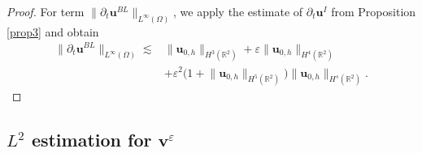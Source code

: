\documentclass[pdflatex,sn-mathphys-num]{sn-jnl}%
\theoremstyle{thmstyleone}%
\theoremstyle{thmstyletwo}%
\theoremstyle{thmstylethree}%
\theoremstyle{thmstyletwo}
\begin{document}
\begin{proof}
	
	For term $\lVert \partial_t\boldsymbol{u}^{BL} \rVert_{L^\infty(\Omega)}$, we apply the estimate of $\partial_t\boldsymbol{u}^{I}$ from Proposition \ref{prop3} and obtain
	\begin{align*}
		\lVert \partial_t\boldsymbol{u}^{BL} \rVert_{L^\infty(\Omega)}
		\lesssim&
		\lVert{\boldsymbol{u}}_{0,h}\rVert_{H^{3}(\mathbb{R}^2)}
		+\varepsilon
		\lVert{\boldsymbol{u}}_{0,h}\rVert_{H^{4}(\mathbb{R}^2)}\\
		&+\varepsilon^2
		\big(
		1+
		\lVert {\boldsymbol{u}}_{0,h} \rVert_{H^{5}(\mathbb{R}^2)}
		\big)\lVert {\boldsymbol{u}}_{0,h} \rVert_{H^{s}(\mathbb{R}^2)}.
	\end{align*}
\end{proof}






\subsection{$L^2$ estimation for $\boldsymbol{v}^\varepsilon$}\label{sub4.1}
\end{document}
